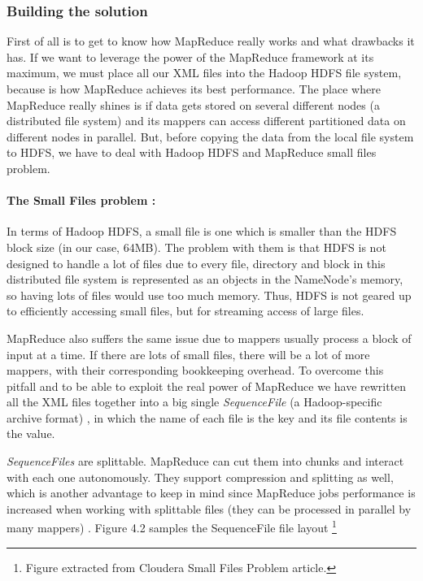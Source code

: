 \subsubsection{Building the solution}

First of all is to get to know how MapReduce really works and what drawbacks it has. If we want to leverage the power of the MapReduce framework at its maximum, we must place all our XML files into the Hadoop HDFS file system, because is how MapReduce achieves its best performance. The place where MapReduce really shines is if data gets stored on several different nodes (a distributed file system) and its mappers can access different partitioned data on different nodes in parallel. But, before copying the data from the local file system to HDFS, we have to deal with Hadoop HDFS and MapReduce small files problem.

\paragraph{The Small Files problem \cite{liu2009implementing}:} In terms of Hadoop HDFS, a small file is one which is smaller than the HDFS block size (in our case, 64MB). The problem with them is that HDFS is not designed to handle a lot of files due to every file, directory and block in this distributed file system is represented as an objects in the NameNode's memory, so having lots of files would use too much memory. Thus, HDFS is not geared up to efficiently accessing small files, but for streaming access of large files. 
\par
MapReduce also suffers the same issue due to mappers usually process a block of input at a time. If there are lots of small files, there will be a lot of more mappers, with their corresponding bookkeeping overhead. To overcome this pitfall and to be able to exploit the real power of MapReduce we have rewritten all the XML files together into a big single \textit{SequenceFile} (a Hadoop-specific archive format) \cite{ApacheHadoopSequenceFile}, in which the name of each file is the key and its file contents is the value. 
\par
\textit{SequenceFiles} are splittable. MapReduce can cut them into chunks and interact with each one autonomously. They support compression and splitting as well, which is another advantage to keep in mind since MapReduce jobs performance is increased when working with splittable files (they can be processed in parallel by many mappers)  \cite{SmallFiles}. Figure 4.2 samples the SequenceFile file layout \footnote{Figure extracted from Cloudera Small Files Problem article.}

